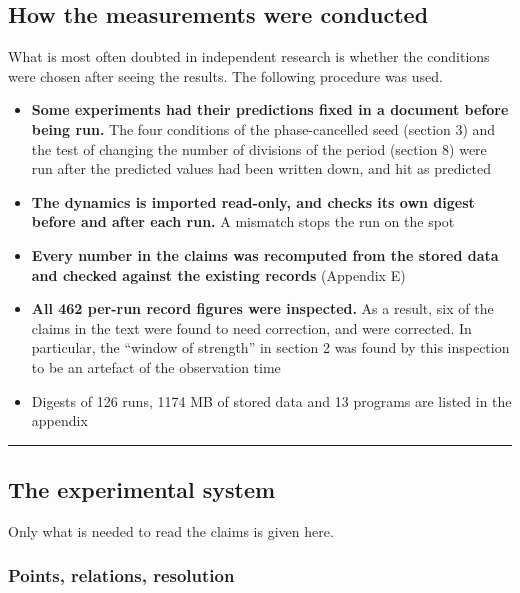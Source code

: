 \documentclass[
]{article}
\providecommand{\tightlist}{%
  \setlength{\itemsep}{0pt}\setlength{\parskip}{0pt}}
\begin{document}
\subsection{How the measurements were
conducted}\label{how-the-measurements-were-conducted}

What is most often doubted in independent research is whether the
conditions were chosen after seeing the results. The following procedure
was used.

\begin{itemize}
\tightlist
\item
  \textbf{Some experiments had their predictions fixed in a document
  before being run.} The four conditions of the phase-cancelled seed
  (section 3) and the test of changing the number of divisions of the
  period (section 8) were run after the predicted values had been
  written down, and hit as predicted
\item
  \textbf{The dynamics is imported read-only, and checks its own digest
  before and after each run.} A mismatch stops the run on the spot
\item
  \textbf{Every number in the claims was recomputed from the stored data
  and checked against the existing records} (Appendix E)
\item
  \textbf{All 462 per-run record figures were inspected.} As a result,
  six of the claims in the text were found to need correction, and were
  corrected. In particular, the ``window of strength'' in section 2 was
  found by this inspection to be an artefact of the observation time
\item
  Digests of 126 runs, 1174 MB of stored data and 13 programs are listed
  in the appendix
\end{itemize}

\begin{center}\rule{0.5\linewidth}{0.5pt}\end{center}

\subsection{The experimental system}\label{the-experimental-system}

Only what is needed to read the claims is given here.

\subsubsection{Points, relations,
resolution}\label{points-relations-resolution}
\end{document}
